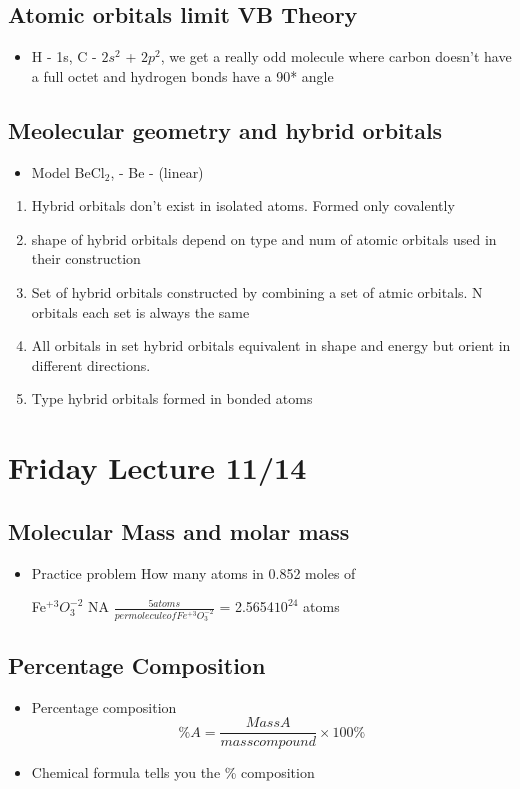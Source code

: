 \documentclass{article}
\begin{document}
\subsection{Atomic orbitals limit VB Theory}
\begin{itemize}
  \item H - 1s, C - $2s^2$ + $2p^2$, we get a really odd molecule where
    carbon doesn't have a full octet and hydrogen bonds have a 90* angle
\end{itemize}

\subsection{Meolecular geometry and hybrid orbitals}
\begin{itemize}
  \item Model BeCl$_2$,   - Be -  (linear)
\end{itemize}

\begin{enumerate}
  \item Hybrid orbitals don't exist in isolated atoms. Formed only covalently
  \item shape of hybrid orbitals depend on type and num of atomic orbitals used in their construction
  \item Set of hybrid orbitals constructed by combining a set of atmic orbitals. N orbitals each set is always the same
  \item All orbitals in set hybrid orbitals equivalent in shape and energy but orient in different directions.
  \item Type hybrid orbitals formed in bonded atoms
\end{enumerate}

\pagebreak

\section{Friday Lecture 11/14}
\subsection{Molecular Mass and molar mass}
\begin{itemize}
  \item Practice problem
    How many atoms in 0.852 moles of

    Fe$^{+3}O_3^{-2}$ \times{} NA \times{} $\frac{5 atoms}{per molecule of Fe^{+3}O_3^{-2}} $
    = 2.5654\cdot{}$10^{24}$ atoms
\end{itemize}

\subsection{Percentage Composition}
\begin{itemize}
  \item Percentage composition
    $$ \%A = \frac{Mass{} A}{mass{} compound} \times{} 100\% $$
  \item Chemical formula tells you the \% composition
\end{itemize}
\end{document}
